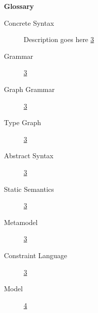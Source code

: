 
\noHeader
\vspace*{2cm}

{\bf \huge Glossary}

\vspace{0.5cm}

\begin{description}

\item[Concrete Syntax] Description goes here \hfill \hyperlink{page.3}{3}

\item[Grammar] \hfill \hyperlink{page.3}{3}

\item[Graph Grammar] \hfill \hyperlink{page.3}{3}

\item[Type Graph] \hfill \hyperlink{page.3}{3}

\item[Abstract Syntax] \hfill \hyperlink{page.3}{3}

\item[Static Semantics] \hfill \hyperlink{page.3}{3}

\item[Metamodel] \hfill \hyperlink{page.3}{3}

\item[Constraint Language] \hfill \hyperlink{page.3}{3}

\item[Model] \hfill \hyperlink{page.4}{4}

\end{description}